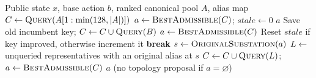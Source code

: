 \begin{algorithm}[t]
\caption{Progressive topology search with incumbent-substation completion}
\begin{algorithmic}[1]
\Require Public state $x$, base action $b$, ranked canonical pool $A$, alias map
\State $C \gets \textsc{Query}(A[1:\min(128,|A|)])$
\State $a \gets \textsc{BestAdmissible}(C)$; $\textit{stale} \gets 0$
  \State \Return $a$
\EndIf
{}
  \State Save old incumbent key; $C \gets C\cup\textsc{Query}(B)$
  \State $a\gets\textsc{BestAdmissible}(C)$
  \State Reset $\textit{stale}$ if key improved, otherwise increment it
    \State \textbf{break}
  \EndIf
\EndFor
{}
  \State $s\gets\textsc{OriginalSubstation}(a)$
  \State $L\gets$ unqueried representatives with an original alias at $s$
  \State $C\gets C\cup\textsc{Query}(L)$; $a\gets\textsc{BestAdmissible}(C)$
\EndIf
\State \Return $a$ (no topology proposal if $a=\varnothing$)
\end{algorithmic}
\end{algorithm}
